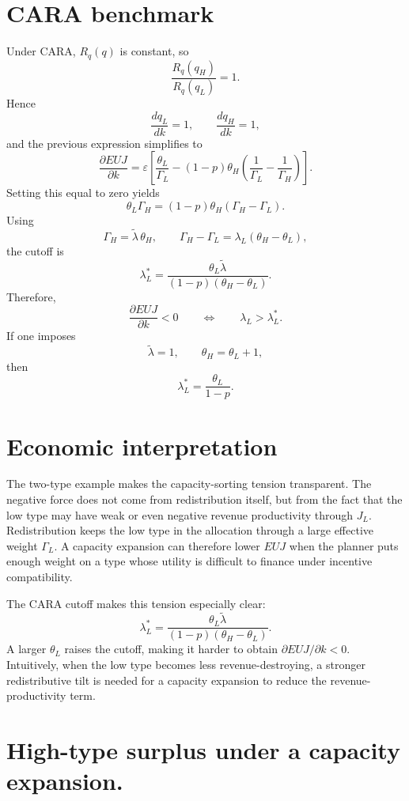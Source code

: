 \documentclass[11pt]{article}
\begin{document}
\section{CARA benchmark}

Under CARA, $R_q(q)$ is constant, so
\[
\frac{R_q(q_H)}{R_q(q_L)}=1.
\]
Hence
\[
\frac{dq_L}{dk}=1,
\qquad
\frac{dq_H}{dk}=1,
\]
and the previous expression simplifies to
\[
\frac{\partial EUJ}{\partial k}
=
\varepsilon
\left[
\frac{\theta_L}{\Gamma_L}
-
(1-p)\theta_H\left(\frac{1}{\Gamma_L}-\frac{1}{\Gamma_H}\right)
\right].
\]
Setting this equal to zero yields
\[
\theta_L\Gamma_H=(1-p)\theta_H\left(\Gamma_H-\Gamma_L\right).
\]
Using
\[
\Gamma_H=\tilde{\lambda}\,\theta_H,
\qquad
\Gamma_H-\Gamma_L=\lambda_L\left(\theta_H-\theta_L\right),
\]
the cutoff is
\[
\lambda_L^{\ast}
=
\frac{\theta_L\tilde{\lambda}}{(1-p)\left(\theta_H-\theta_L\right)}.
\]
Therefore,
\[
\frac{\partial EUJ}{\partial k}<0
\qquad\Longleftrightarrow\qquad
\lambda_L>\lambda_L^{\ast}.
\]
If one imposes
\[
\tilde{\lambda}=1,
\qquad
\theta_H=\theta_L+1,
\]
then
\[
\lambda_L^{\ast}=\frac{\theta_L}{1-p}.
\]

\section{Economic interpretation}

The two-type example makes the capacity-sorting tension transparent. The negative force does not come from redistribution itself, but from the fact that the low type may have weak or even negative revenue productivity through $J_L$. Redistribution keeps the low type in the allocation through a large effective weight $\Gamma_L$. A capacity expansion can therefore lower $EUJ$ when the planner puts enough weight on a type whose utility is difficult to finance under incentive compatibility.

The CARA cutoff makes this tension especially clear:
\[
\lambda_L^{\ast}
=
\frac{\theta_L\tilde{\lambda}}{(1-p)\left(\theta_H-\theta_L\right)}.
\]
A larger $\theta_L$ raises the cutoff, making it harder to obtain $\partial EUJ/\partial k<0$. Intuitively, when the low type becomes less revenue-destroying, a stronger redistributive tilt is needed for a capacity expansion to reduce the revenue-productivity term.

\section{High-type surplus under a capacity expansion.}
\end{document}
